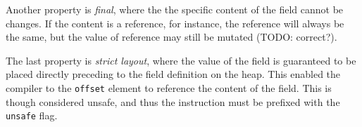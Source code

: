 Another property is {\em final}, where the the specific content of the field
cannot be changes. If the content is a reference, for instance, the reference
will always be the same, but the value of reference may still be mutated (TODO:
correct?).

The last property is {\em strict layout}, where the value of the field is
guaranteed to be placed directly preceding to the field definition on the
heap. This enabled the compiler to the {\tt offset} element to reference the
content of the field. This is though considered unsafe, and thus the instruction
must be prefixed with the {\tt unsafe} flag.

